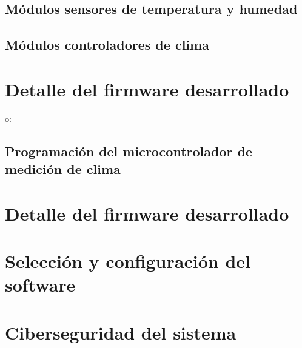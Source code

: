 \subsection{Módulos sensores de temperatura y humedad}
\label{Módulos sensores de temperatura y humedad}

\subsection{Módulos controladores de clima}
\label{Módulos controladores de clima}

\section{Detalle del firmware desarrollado}
\label{sec:Desarrollo del firmware}

o:

\subsection{Programación del microcontrolador de medición de clima}
\label{Módulos controladores de clima}

\section{Detalle del firmware desarrollado}
\label{sec:Desarrollo del firmware}


\section{Selección y configuración del software}
\label{sec:Selección y configuración del software}

\section{Ciberseguridad del sistema}
\label{sec:Ciberseguridad del sistema}
